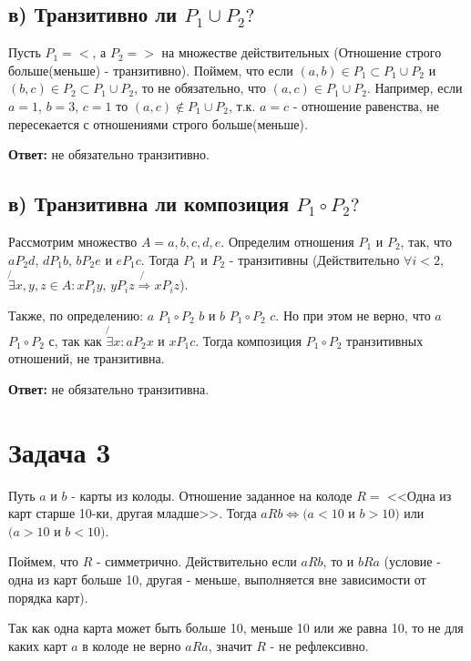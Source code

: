 \documentclass{article}
\begin{document}
	\subsection{в) Транзитивно ли $P_1 \cup P_2?$}
	
	Пусть $P_1 = <$, а $P_2 = >$ на множестве действительных (Отношение строго больше(меньше) - транзитивно). Поймем, что если $(a, b) \in P_1 \subset P_1 \cup P_2$ и $(b, c) \in P_2 \subset P_1 \cup P_2$, то не обязательно, что $(a, c) \in P_1 \cup P_2$. Например, если $a = 1$, $b = 3$, $c = 1$ то $(a, c) \notin P_1 \cup P_2$, т.к. $a = c$ - отношение равенства, не пересекается с отношениями строго больше(меньше).  
	
	\textbf{Ответ:} не обязательно транзитивно.
	
	\subsection{в) Транзитивна ли композиция $P_1 \circ P_2?$}
	
	Рассмотрим множество $A = {a, b, c, d, e}$. Определим отношения $P_1$ и $P_2$, так, что $a P_2 d$, $d P_1 b$, $b P_2 e$ и $e P_1 c$. Тогда $P_1$ и $P_2$ - транзитивны (Действительно $\forall i < 2$, $\not {\exists} x, y, z \in A: x P_i y$, $y P_i z \not{\Rightarrow} x P_i z$). 
	
	Также, по определению: $a$ $P_1 \circ P_2$ $b$ и $b$ $P_1 \circ P_2$ $c$. Но при этом не верно, что $a$ $P_1 \circ P_2$ $с$, так как $\not{\exists} x: a P_2 x$ и $x P_1 c$. Тогда композиция $P_1 \circ P_2$ транзитивных отношений, не транзитивна.
	
	\textbf{Ответ:} не обязательно транзитивна.
	
	\section {Задача 3}
	
	Путь $a$ и $b$ - карты из колоды. Отношение заданное на колоде $R = $ <<Одна из карт старше 10-ки, другая младше>>. Тогда $a R b \Leftrightarrow (a < 10$ и $b > 10)$  или $(a > 10$ и $b < 10)$. 
	
	Поймем, что $R$ - симметрично. Действительно если $a R b$, то и $b R a$ (условие - одна из карт больше 10, другая - меньше, выполняется вне зависимости от порядка карт).
	
	Так как одна карта может быть больше 10, меньше 10 или же равна 10, то не для каких карт $a$ в колоде не верно $a R a$, значит $R $ - не рефлексивно.
	
\end{document}

